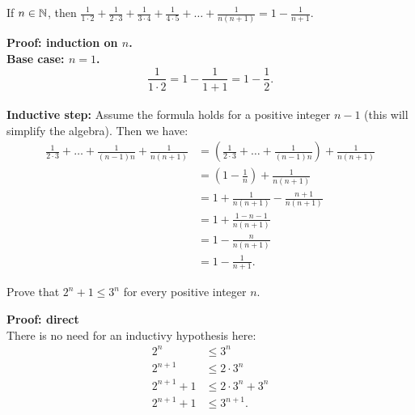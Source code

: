 \documentclass{article}
\begin{document}
\begin{problem}
If $n \in \mathbb{N}$, then $\frac{1}{1\cdot 2} + \frac{1}{2\cdot 3} + \frac{1}{3\cdot 4} + \frac{1}{4\cdot 5}+ \ldots + \frac{1}{n(n+1)} = 1 - \frac{1}{n+1}$.
\end{problem}
\textbf{Proof: induction on $n$.}
\\

\textbf{Base case: $n = 1$.}
$$\frac{1}{1\cdot 2} = 1 - \frac{1}{1+1} = 1 - \frac{1}{2}.$$
\\

\textbf{Inductive step:} Assume the formula holds for a positive integer $n - 1$ (this will simplify the algebra). Then we have:
\begin{align*}
    \frac{1}{2\cdot 3} + \ldots + \frac{1}{(n-1)n} + \frac{1}{n(n+1)} & =  (\frac{1}{2\cdot 3} + \ldots + \frac{1}{(n-1)n}) + \frac{1}{n(n+1)} \\
                                                                      & = \left(1 - \frac{1}{n}\right) + \frac{1}{n(n+1)}                      \\
                                                                      & = 1 + \frac{1}{n(n+1)} - \frac{n+1}{n(n+1)}                            \\
                                                                      & = 1 + \frac{1 - n - 1}{n(n+1)}                                         \\
                                                                      & = 1 - \frac{n}{n(n+1)}                                                 \\
                                                                      & = 1 - \frac{1}{n+1}.
\end{align*}

\begin{problem}
Prove that $2^n + 1 \leq 3^n$ for every positive integer $n$.
\end{problem}
\textbf{Proof: direct}
\\

There is no need for an inductivy hypothesis here:
\begin{align*}
    2^n         & \leq 3^n              \\
    2^{n+1}     & \leq 2\cdot 3^n       \\
    2^{n+1} + 1 & \leq 2\cdot 3^n + 3^n \\
    2^{n+1} + 1 & \leq 3^{n+1}.
\end{align*}
\end{document}
